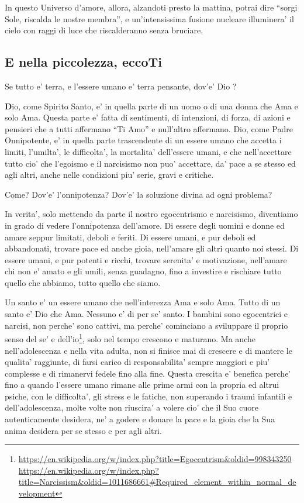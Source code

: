 In questo Universo d'amore, allora, alzandoti presto la mattina, potrai dire ``sorgi Sole, riscalda le nostre membra'', e un'intensissima fusione nucleare illuminera' il cielo con raggi di luce che riscalderanno senza bruciare.

\subsection{E nella piccolezza, eccoTi}
\label{DioPadreOnnipotenteDef}

Se tutto e' terra, e l'essere umano e' terra pensante, dov'e' Dio ?

\textbf{D}io, come Spirito Santo, e' in quella parte di un uomo o di una donna che Ama e solo Ama.
Questa parte e' fatta di sentimenti, di intenzioni, di forza, di azioni e pensieri che a tutti affermano ``Ti Amo'' e null'altro affermano.
Dio, come Padre Onnipotente, e' in quella parte trascendente di un essere umano che accetta i limiti, l'umilta', le difficolta', la mortalita' dell'essere umani, e che nell'accettare tutto cio' che l'egoismo e il narcisismo non puo' accettare, da' pace a se stesso ed agli altri, anche nelle condizioni piu' serie, gravi e critiche.

Come? Dov'e' l'onnipotenza? Dov'e' la soluzione divina ad ogni problema?

In verita', solo mettendo da parte il nostro egocentrismo e narcisismo, diventiamo in grado di vedere l'onnipotenza dell'amore. Di essere degli uomini e donne ed amare seppur limitati, deboli e feriti. Di essere umani, e pur deboli ed abbandonati, trovare pace ed anche gioia, nell'amare gli altri quanto noi stessi. Di essere umani, e pur potenti e ricchi, trovare serenita' e motivazione, nell'amare chi non e' amato e gli umili, senza guadagno, fino a investire e rischiare tutto quello che abbiamo, tutto quello che siamo.

Un santo e' un essere umano che nell'interezza Ama e solo Ama. Tutto di un santo e' Dio che Ama. Nessuno e' di per se' santo. I bambini sono egocentrici e narcisi, non perche' sono cattivi, ma perche' cominciano a sviluppare il proprio senso del se' e dell'io\footnote{\url{https://en.wikipedia.org/w/index.php?title=Egocentrism\&oldid=998343250} \url{https://en.wikipedia.org/w/index.php?title=Narcissism\&oldid=1011686661\#Required\_element\_within\_normal\_development}}, solo nel tempo crescono e maturano.  Ma anche nell'adolescenza e nella vita adulta, non si finisce mai di crescere e di mantere le qualita' raggiunte, di farsi carico di responsabilita' sempre maggiori e piu' complesse e di rimanervi fedele fino alla fine. Questa crescita e' benefica perche' fino a quando l'essere umano rimane alle prime armi con la propria ed altrui psiche, con le difficolta', gli stress e le fatiche, non superando i traumi infantili e dell'adolescenza, molte volte non riuscira' a volere cio' che il Suo cuore autenticamente desidera, ne' a godere e donare la pace e la gioia che la Sua anima desidera per se stesso e per agli altri.

